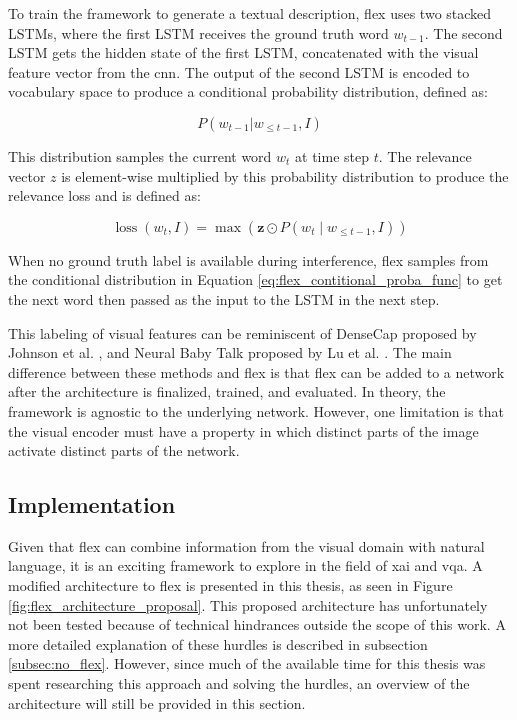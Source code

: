         To train the framework to generate a textual description, \gls{flex} uses two stacked LSTMs, where the first LSTM receives the ground truth word $w_{t-1}$. The second LSTM gets the hidden state of the first LSTM, concatenated with the visual feature vector from the \gls{cnn}. The output of the second LSTM is encoded to vocabulary space to produce a conditional probability distribution, defined as:

        \begin{equation}
            P (w_{t-1} | w_{\le t-1}, I)
        \label{eq:flex_contitional_proba_func}
        \end{equation}
        
        This distribution samples the current word $w_t$ at time step $t$.  
        The relevance vector $z$ is element-wise multiplied by this probability distribution to produce the relevance loss and is defined as:

        \begin{equation}
            \operatorname{loss}\left(w_t, I\right)=\max \left(\boldsymbol{z} \odot P\left(w_t \mid w_{\leq t-1}, I\right)\right)
        \end{equation}

        When no ground truth label is available during interference, \gls{flex} samples from the conditional distribution in Equation \ref{eq:flex_contitional_proba_func} to get the next word then passed as the input to the LSTM in the next step.
                

   
        This labeling of visual features can be reminiscent of DenseCap proposed by Johnson et al. \cite{johnsonDenseCapFullyConvolutional2016}, and Neural Baby Talk proposed by Lu et al. \cite{luNeuralBabyTalk2018}. The main difference between these methods and \gls{flex} is that \gls{flex} can be added to a network after the architecture is finalized, trained, and evaluated. In theory, the framework is agnostic to the underlying network. However, one limitation is that the visual encoder must have a property in which distinct parts of the image activate distinct parts of the network. 
        
        
        

        \subsection{Implementation}
        Given that \gls{flex} can combine information from the visual domain with natural language, it is an exciting framework to explore in the field of \gls{xai} and \gls{vqa}. A modified architecture to \gls{flex} is presented in this thesis, as seen in Figure \ref{fig:flex_architecture_proposal}. This proposed architecture has unfortunately not been tested because of technical hindrances outside the scope of this work. A more detailed explanation of these hurdles is described in subsection \ref{subsec:no_flex}. However, since much of the available time for this thesis was spent researching this approach and solving the hurdles, an overview of the architecture will still be provided in this section.


